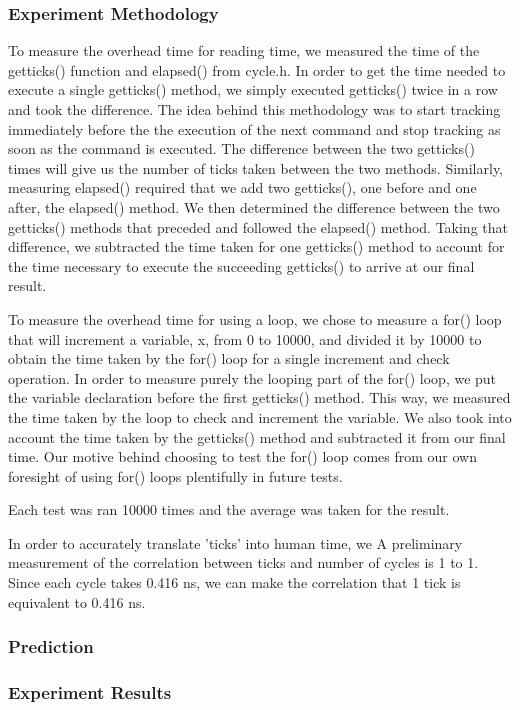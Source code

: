 \documentclass{article} %
\begin{document}
\subsubsection{Experiment Methodology}
To measure the overhead time for reading time, we measured the time of the getticks() function and elapsed() from cycle.h. In order to get the time needed to execute a single getticks() method, we simply executed getticks() twice in a row and took the difference. The idea behind this methodology was to start tracking immediately before the the execution of the next command and stop tracking as soon as the command is executed. The difference between the two getticks() times will give us the number of ticks taken between the two methods. Similarly, measuring elapsed() required that we add two getticks(), one before and one after, the elapsed() method. We then determined the difference between the two getticks() methods that preceded and followed the elapsed() method. Taking that difference, we subtracted the time taken for one getticks() method to account for the time necessary to execute the succeeding getticks() to arrive at our final result. 
  
To measure the overhead time for using a loop, we chose to measure a for() loop that will increment a variable, x, from 0 to 10000, and divided it by 10000 to obtain the time taken by the for() loop for a single increment and check operation. In order to measure purely the looping part of the for() loop, we put the variable declaration before the first getticks() method. This way, we measured the time taken by the loop to check and increment the variable. We also took into account the time taken by the getticks() method and subtracted it from our final time. Our motive behind choosing to test the for() loop comes from our own foresight of using for() loops plentifully in future tests.

Each test was ran 10000 times and the average was taken for the result.

In order to accurately translate 'ticks' into human time, we A preliminary measurement of the correlation between ticks and number of cycles is 1 to 1. Since each cycle takes 0.416 ns, we can make the correlation that 1 tick is equivalent to 0.416 ns.
\subsubsection{Prediction}

\subsubsection{Experiment Results}
\end{document}
